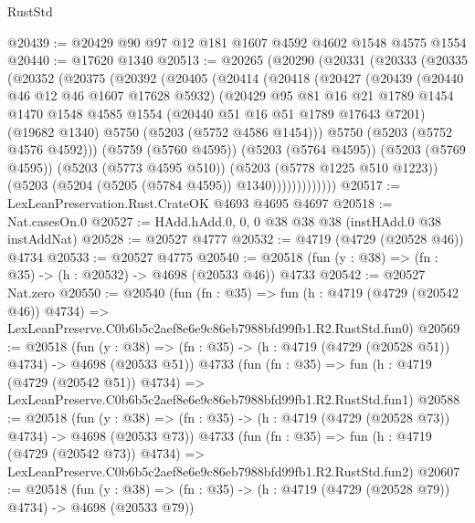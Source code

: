\begin{lexlean}{RustStd}
\begin{coremodule}
@20439 := @20429 @90 @97 @12 @181 @1607 @4592 @4602 @1548 @4575 @1554
@20440 := @17620 @1340
@20513 := @20265
    (@20290
      (@20331
        (@20333
          (@20335
            (@20352
              (@20375
                (@20392
                  (@20405
                    (@20414
                      (@20418
                        (@20427
                          (@20439
                            (@20440 @46 @12 @46 @1607 @17628 @5932)
                            (@20429
                              @95
                              @81
                              @16
                              @21
                              @1789
                              @1454
                              @1470
                              @1548
                              @4585
                              @1554
                              (@20440 @51 @16 @51 @1789 @17643 @7201)
                              (@19682 @1340)
                              @5750
                              (@5203 (@5752 @4586 @1454)))
                            @5750
                            (@5203 (@5752 @4576 @4592)))
                          (@5759 (@5760 @4595))
                          (@5203 (@5764 @4595))
                          (@5203 (@5769 @4595))
                          (@5203 (@5773 @4595 @510))
                          (@5203 (@5778 @1225 @510 @1223))
                          (@5203 (@5204 (@5205 (@5784 @4595)) @1340)))))))))))))
@20517 := LexLeanPreservation.Rust.CrateOK @4693 @4695 @4697
@20518 := Nat.casesOn.{0}
@20527 := HAdd.hAdd.{0, 0, 0} @38 @38 @38 (instHAdd.{0} @38 instAddNat)
@20528 := @20527 @4777
@20532 := @4719 (@4729 (@20528 @46)) @4734
@20533 := @20527 @4775
@20540 := @20518 (fun (y : @38) => (fn : @35) -> (h : @20532) -> @4698 (@20533 @46)) @4733
@20542 := @20527 Nat.zero
@20550 := @20540
    (fun (fn : @35) =>
    fun (h : @4719 (@4729 (@20542 @46)) @4734) =>
    LexLeanPreserve.C0b6b5c2aef8e6e9c86eb7988bfd99fb1.R2.RustStd.fun0)
@20569 := @20518
    (fun (y : @38) => (fn : @35) -> (h : @4719 (@4729 (@20528 @51)) @4734) -> @4698 (@20533 @51))
    @4733
    (fun (fn : @35) =>
    fun (h : @4719 (@4729 (@20542 @51)) @4734) =>
    LexLeanPreserve.C0b6b5c2aef8e6e9c86eb7988bfd99fb1.R2.RustStd.fun1)
@20588 := @20518
    (fun (y : @38) => (fn : @35) -> (h : @4719 (@4729 (@20528 @73)) @4734) -> @4698 (@20533 @73))
    @4733
    (fun (fn : @35) =>
    fun (h : @4719 (@4729 (@20542 @73)) @4734) =>
    LexLeanPreserve.C0b6b5c2aef8e6e9c86eb7988bfd99fb1.R2.RustStd.fun2)
@20607 := @20518
    (fun (y : @38) => (fn : @35) -> (h : @4719 (@4729 (@20528 @79)) @4734) -> @4698 (@20533 @79))

\end{coremodule}
\end{lexlean}
